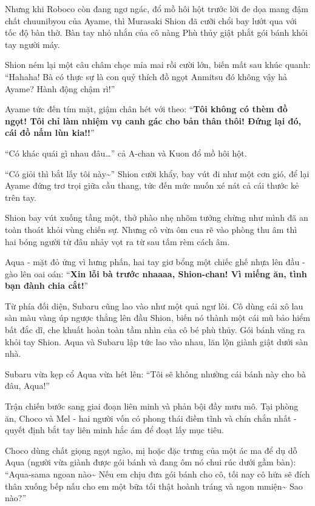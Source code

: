 \documentclass[../main.tex]{subfiles}
\begin{document}
Nhưng khi Roboco còn đang ngơ ngác, đổ mồ hôi hột trước lời đe dọa mang đậm chất chuunibyou của Ayame, thì Murasaki Shion đã cưỡi chổi bay lướt qua với tốc độ bàn thờ. Bàn tay nhỏ nhắn của cô nàng Phù thủy giật phắt gói bánh khỏi tay người máy.

Shion ném lại một câu châm chọc mỉa mai rồi cười lớn, biến mất sau khúc quanh:
``Hahaha! Bà có thực sự là con quỷ thích đồ ngọt Anmitsu đó không vậy hả Ayame? Hành động chậm rì!''

Ayame tức đến tím mặt, giậm chân hét với theo:
``\textbf{Tôi không có thèm đồ ngọt! Tôi chỉ làm nhiệm vụ canh gác cho bản thân thôi! Đứng lại đó, cái đồ nấm lùn kia!!}''

``Có khác quái gì nhau đâu\dots'' cả A-chan và Kuon đổ mồ hôi hột.

``Có giỏi thì bắt lấy tôi này\~{}'' Shion cười khẩy, bay vút đi như một cơn gió, để lại Ayame đứng trơ trọi giữa cầu thang, tức đến mức muốn xé nát cả cái thước kẻ trên tay.

Shion bay vút xuống tầng một, thở phào nhẹ nhõm tưởng chừng như mình đã an toàn thoát khỏi vùng chiến sự. Nhưng cô vừa ôm cua rẽ vào phòng thu âm thì hai bóng người từ đâu nhảy vọt ra từ sau tấm rèm cách âm.

Aqua - mặt đỏ ửng vì hưng phấn, hai tay giơ bổng một chiếc ghế nhựa lên đầu - gào lên oai oán:
``\textbf{Xin lỗi bà trước nhaaaa, Shion-chan! Vì miếng ăn, tình bạn đành chia cắt!}''

Từ phía đối diện, Subaru cũng lao vào như một quả ngư lôi. Cô dùng cái xô lau sàn màu vàng úp ngược thẳng lên đầu Shion, biến nó thành một cái mũ bảo hiểm bất đắc dĩ, che khuất hoàn toàn tầm nhìn của cô bé phù thủy. Gói bánh văng ra khỏi tay Shion. Aqua và Subaru lập tức lao vào nhau, lăn lộn giành giật dưới sàn nhà.

Subaru vừa kẹp cổ Aqua vừa hét lên:
``Tôi sẽ không nhường cái bánh này cho bà đâu, Aqua!''

\ct

Trận chiến bước sang giai đoạn liên minh và phản bội đầy mưu mô. Tại phòng ăn, Choco và Mel - hai người vốn có phong thái điềm tĩnh và chín chắn nhất - quyết định bắt tay liên minh hắc ám để đoạt lấy mục tiêu.

Choco dùng chất giọng ngọt ngào, mị hoặc đặc trưng của một ác ma để dụ dỗ Aqua (người vừa giành được gói bánh và đang ôm nó chui rúc dưới gầm bàn):
``Aqua-sama ngoan nào\~{} Nếu em chịu đưa gói bánh cho cô, tối nay cô hứa sẽ đích thân xuống bếp nấu cho em một bữa tối thật hoành tráng và ngon mmiện\~{} Sao nào?''
\end{document}
